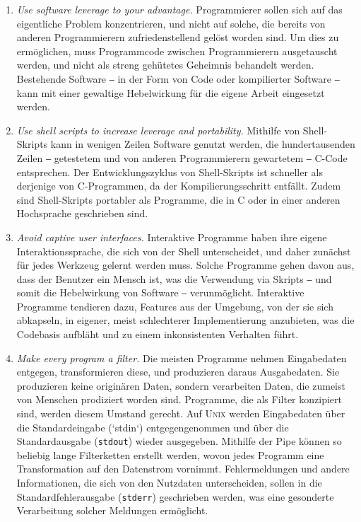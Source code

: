 \begin{enumerate}
    \item \textit{Use software leverage to your advantage.} Programmierer sollen sich auf das eigentliche Problem konzentrieren, und nicht auf solche, die bereits von anderen Programmierern zufriedenstellend gelöst worden sind. Um dies zu ermöglichen, muss Programmcode zwischen Programmierern ausgetauscht werden, und nicht als streng gehütetes Geheimnis behandelt werden. Bestehende Software ‒ in der Form von Code oder kompilierter Software ‒ kann mit einer gewaltige Hebelwirkung für die eigene Arbeit eingesetzt werden.
    \item \textit{Use shell scripts to increase leverage and portability.} Mithilfe von Shell-Skripts kann in wenigen Zeilen Software genutzt werden, die hundertausenden Zeilen ‒ getestetem und von anderen Programmierern gewartetem ‒ C-Code entsprechen. Der Entwicklungszyklus von Shell-Skripts ist schneller als derjenige von C-Programmen, da der Kompilierungsschritt entfällt. Zudem sind Shell-Skripts portabler als Programme, die in C oder in einer anderen Hochsprache geschrieben sind.
    \item \textit{Avoid captive user interfaces.} Interaktive Programme haben ihre eigene Interaktionssprache, die sich von der Shell unterscheidet, und daher zunächst für jedes Werkzeug gelernt werden muss. Solche Programme gehen davon aus, dass der Benutzer ein Mensch ist, was die Verwendung via Skripts ‒ und somit die Hebelwirkung von Software ‒ verunmöglicht. Interaktive Programme tendieren dazu, Features aus der Umgebung, von der sie sich abkapseln, in eigener, meist schlechterer Implementierung anzubieten, was die Codebasis aufbläht und zu einem inkonsistenten Verhalten führt.
    \item \textit{Make every program a filter.} Die meisten Programme nehmen Eingabedaten entgegen, transformieren diese, und produzieren daraus Ausgabedaten. Sie produzieren keine originären Daten, sondern verarbeiten Daten, die zumeist von Menschen prodiziert worden sind. Programme, die als Filter konzipiert sind, werden diesem Umstand gerecht. Auf \textsc{Unix} werden Eingabedaten über die Standardeingabe (`stdin`) entgegengenommen und über die Standardausgabe (\texttt{stdout}) wieder ausgegeben. Mithilfe der Pipe können so beliebig lange Filterketten erstellt werden, wovon jedes Programm eine Transformation auf den Datenstrom vornimmt. Fehlermeldungen und andere Informationen, die sich von den Nutzdaten unterscheiden, sollen in die Standardfehlerausgabe (\texttt{stderr}) geschrieben werden, was eine gesonderte Verarbeitung solcher Meldungen ermöglicht.
\end{enumerate}


